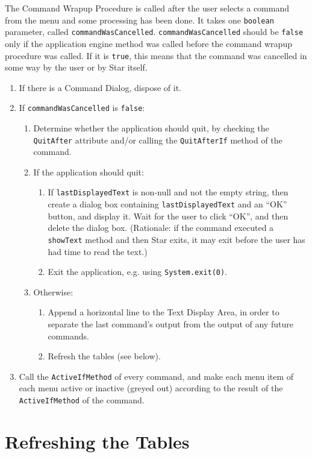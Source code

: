 \documentclass[11pt]{article}
\begin{document}
The Command Wrapup Procedure is called after the user selects a
command from the menu and some processing has been done.  It takes
one {\tt boolean} parameter,
called {\tt commandWasCancelled}.  {\tt commandWasCancelled}
should be {\tt false} only if the application engine method was called before
the command wrapup procedure was called.  If it is {\tt true}, this means that
the command was cancelled in some way by the user or by Star itself.
\begin{enumerate}
\item If there is a Command Dialog, dispose of it.
\item If {\tt commandWasCancelled} is {\tt false}:
  \begin{enumerate}
  \item Determine whether the application should quit, by checking
    the {\tt QuitAfter} attribute and/or calling the {\tt QuitAfterIf}
    method of the command.
  \item If the application should quit:
    \begin{enumerate}
    \item If {\tt lastDisplayedText} is non-null and not the empty string,
      then create a dialog box containing {\tt lastDisplayedText} and
      an ``OK'' button, and display it.  Wait for the user to
      click ``OK'', and then delete the dialog box.
      (Rationale:  if the command executed a {\tt showText} method and
      then Star exits, it may exit before the user has had time to
      read the text.)
    \item Exit the application, e.g. using {\tt System.exit(0)}.
    \end{enumerate}
  \item Otherwise:
    \begin{enumerate}
    \item Append a horizontal line to the Text Display Area, in order to
      separate the last command's output from the output of any
      future commands.
    \item Refresh the tables (see below).
    \end{enumerate}
  \end{enumerate}
\item Call the {\tt ActiveIfMethod} of every command, and make each
  menu item of each menu active or inactive (greyed out) according to
  the result of the {\tt ActiveIfMethod} of the command.
\end{enumerate}

\section{Refreshing the Tables}
\end{document}

